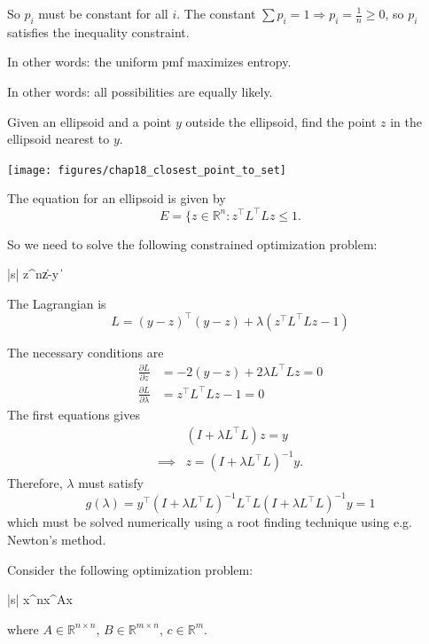 \documentclass{article}
\newcommand{\norm}[1]{\left\|{#1}\right\|}
\begin{document}
	So $p_i$ must be constant for all $i$.  The constant $\sum p_i = 1 \Rightarrow p_i = \frac{1}{n} \geq 0$, so $p_i$ satisfies the inequality constraint.
	
	\vfill
	
	In other words: the uniform pmf maximizes entropy.
	
	\vfill
	
	In other words: all possibilities are equally likely.	

\par{}
	Given an ellipsoid and a point $y$ outside the ellipsoid, find the point $z$ in the ellipsoid nearest to $y$.\\
	\begin{center}
		\texttt{[image: figures/chap18\_closest\_point\_to\_set]}
	\end{center}
	The equation for an ellipsoid is given by
	\[ 
		E = \{ z\in \mathbb{R}^n : z^\top L^\top Lz \leq 1.
	\]	

	So we need to solve the following constrained optimization problem:
	\begin{mini*}|s|
		{z\in{}^n}{\norm{z-y }}{}{}
	\end{mini*}
	The Lagrangian is
	\[ 
		L = (y - z)^\top (y - z) + \lambda(z^\top L^\top Lz - 1) 
	\]
	
	The necessary conditions are
	\begin{align*}
		\frac{\partial L}{\partial z} &= -2(y - z) + 2\lambda L^\top Lz = 0 \\
		\frac{\partial L}{\partial \lambda} &= z^\top L^\top Lz - 1 = 0
	\end{align*}
	The first equations gives
	\begin{align*}
		& (I + \lambda L^\top L)z = y \\
		\implies & z = (I + \lambda L^\top L)^{-1}y.
	\end{align*}
	Therefore, $\lambda$ must satisfy
	\[ 
		g(\lambda) = y^\top (I+\lambda L^\top L)^{-1}L^\top L(I + \lambda L^\top L)^{-1}y = 1 
	\]
	which must be solved numerically using a  root finding technique using e.g. Newton's method.	


\par{}
	Consider the following optimization problem:
	\begin{mini*}|s|
		{x\in{}^n}{x^\top Ax}{}{}
	\end{mini*}		
	where $A\in\mathbb{R}^{n\times n}$, 
	$B\in\mathbb{R}^{m\times n}$, 
	$c \in \mathbb{R}^{m}$.
	
\end{document}
